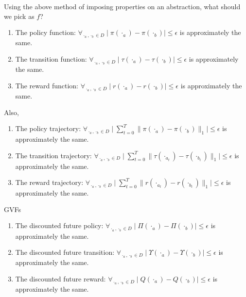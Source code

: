 Using the above method of imposing properties on an abstraction, what
should we pick as \(f\)?

\begin{enumerate}
\def\labelenumi{\arabic{enumi}.}
\tightlist
\item
  The policy function:
  \(\forall_{\cdot_a, \cdot_b \in D} \mid \pi(\cdot_a) - \pi(\cdot_b) \mid \le \epsilon\)
  is approximately the same.
\item
  The transition function:
  \(\forall_{\cdot_a, \cdot_b \in D} \mid \tau(\cdot_a) - \tau(\cdot_b)\mid \le \epsilon\)
  is approximately the same.
\item
  The reward function:
  \(\forall_{\cdot_a, \cdot_b \in D} \mid r(\cdot_a) - r(\cdot_b) \mid \le \epsilon\)
  is approximately the same.
\end{enumerate}

Also,

\begin{enumerate}
\def\labelenumi{\arabic{enumi}.}
\setcounter{enumi}{3}
\tightlist
\item
  The policy trajectory:
  \(\forall_{\cdot_a, \cdot_b \in D} \mid \sum_{t=0}^T \parallel \pi(\cdot_a) - \pi(\cdot_b)\parallel_1 \mid \le \epsilon\)
  is approximately the same.
\item
  The transition trajectory:
  \(\forall_{\cdot_a, \cdot_b \in D} \mid \sum_{t=0}^T\parallel \tau(\cdot_{a_t}) - \tau(\cdot_{b_t})\parallel_1\mid \le \epsilon\)
  is approximately the same.
\item
  The reward trajectory:
  \(\forall_{\cdot_a, \cdot_b \in D} \mid \sum_{t=0}^T \parallel r(\cdot_{a_t}) - r(\cdot_{b_t})\parallel_1 \mid \le \epsilon\)
  is approximately the same.
\end{enumerate}

GVFs

\begin{enumerate}
\def\labelenumi{\arabic{enumi}.}
\setcounter{enumi}{6}
\tightlist
\item
  The discounted future policy:
  \(\forall_{\cdot_a, \cdot_b \in D} \mid \Pi(\cdot_a) - \Pi(\cdot_b)\mid \le \epsilon\)
  is approximately the same.
\item
  The discounted future transition:
  \(\forall_{\cdot_a, \cdot_b \in D} \mid \Upsilon(\cdot_a) - \Upsilon (\cdot_b)\mid \le \epsilon\)
  is approximately the same.
\item
  The discounted future reward:
  \(\forall_{\cdot_a, \cdot_b \in D} \mid Q(\cdot_a) - Q(\cdot_b)\mid \le \epsilon\)
  is approximately the same.
\end{enumerate}

